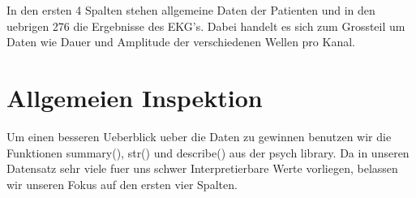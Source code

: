 \documentclass[
]{article}
\begin{document}
In den ersten 4 Spalten stehen allgemeine Daten der Patienten und in den
uebrigen 276 die Ergebnisse des EKG's. Dabei handelt es sich zum
Grossteil um Daten wie Dauer und Amplitude der verschiedenen Wellen pro
Kanal.

\hypertarget{allgemeien-inspektion}{%
\section{Allgemeien Inspektion}\label{allgemeien-inspektion}}

Um einen besseren Ueberblick ueber die Daten zu gewinnen benutzen wir
die Funktionen summary(), str() und describe() aus der psych library. Da
in unseren Datensatz sehr viele fuer uns schwer Interpretierbare Werte
vorliegen, belassen wir unseren Fokus auf den ersten vier Spalten.
\end{document}
